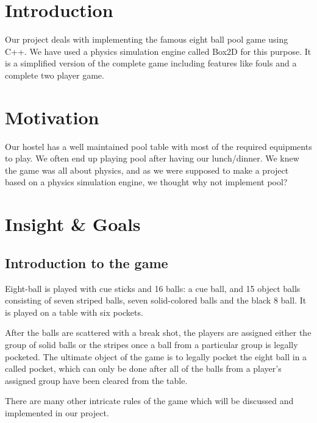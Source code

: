 \documentclass[a4paper,12pt]{article}
\begin{document}
\section{Introduction}
Our project deals with implementing the famous eight ball pool game using C++. We have used a physics simulation engine called Box2D for this purpose. It is a simplified version of the complete game including features like fouls and a complete two player game.

\section{Motivation}
Our hostel has a well maintained pool table with most of the required equipments to play. We often end up playing pool after having our lunch/dinner. We knew the game was all about physics, and as we were supposed to make a project based on a physics simulation engine, we thought why not implement pool?

\section{Insight \& Goals}
\subsection{Introduction to the game}
Eight-ball is played with cue sticks and 16 balls: a cue ball, and 15 object balls consisting of seven striped balls, seven solid-colored balls and the black 8 ball. It is played on a table with six pockets.

After the balls are scattered with a break shot, the players are assigned either the group of solid balls or the stripes once a ball from a particular group is legally pocketed. The ultimate object of the game is to legally pocket the eight ball in a called pocket, which can only be done after all of the balls from a player's assigned group have been cleared from the table.

There are many other intricate rules of the game which will be discussed and implemented in our project.
\end{document}

